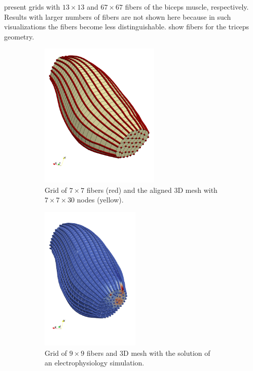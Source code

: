  present grids with $13 \times 13$ and $67 \times 67$ fibers of the biceps muscle, respectively. Results with larger numbers of fibers are not shown here because in such visualizations the fibers become less distinguishable.  show fibers for the triceps geometry.

\begin{figure}%
  \centering%
  \begin{subfigure}[t]{0.30\textwidth}%
    \centering%
    \includegraphics[height=7cm]{images/parallel_fiber_estimation/muscle_mesh.png}
    \caption{Grid of $7 \times 7$ fibers (red) and the aligned 3D mesh with $7 \times 7 \times 30$ nodes (yellow).}%
    \label{fig:muscle_mesh_0}%
  \end{subfigure}
  \quad
  \begin{subfigure}[t]{0.30\textwidth}%
    \centering%
    \includegraphics[height=7cm]{images/parallel_fiber_estimation/muscle_mesh_1b.png}
    \caption{Grid of $9 \times 9$ fibers and 3D mesh with the solution of an electrophysiology simulation.}%
    \label{fig:muscle_mesh_1}%
  \end{subfigure}  
  \quad 
  \begin{subfigure}[t]{0.30\textwidth}%

\end{subfigure}
\end{figure}
